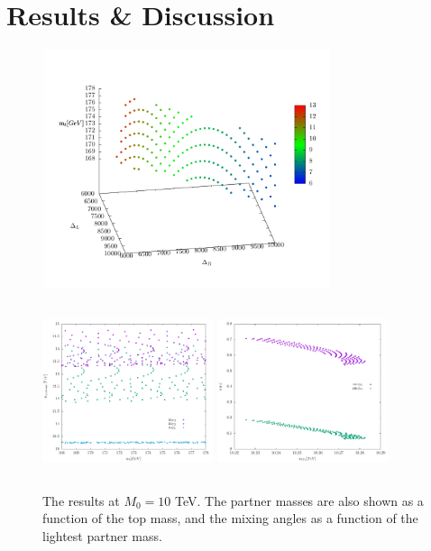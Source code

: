 \documentclass[a4paper]{jpconf}
\begin{document}
\section{Results \& Discussion}
\begin{figure}[h]
	\begin{minipage}[c][10cm]{.5\textwidth}
		\includegraphics[width=8.5cm,height=7cm]{m10000w5ds100LeRy100dm10000_4d}
	\end{minipage}
	\begin{minipage}[c][10cm][t]{.5\textwidth}
		\centering
		\includegraphics[width=5cm,height=5cm]{m10000w5ds100LeRy100dm10000_eigen}
		\includegraphics[width=5cm,height=5cm]{m10000w5ds100LeRy100dm10000_mixing}
		\end{minipage}
	\caption{The results at \(M_0 = 10\) TeV. The partner masses are also shown as a function of the top mass, and the mixing angles as a function of the lightest partner mass.}
	\label{fig:res1}
\end{figure}
\end{document}
